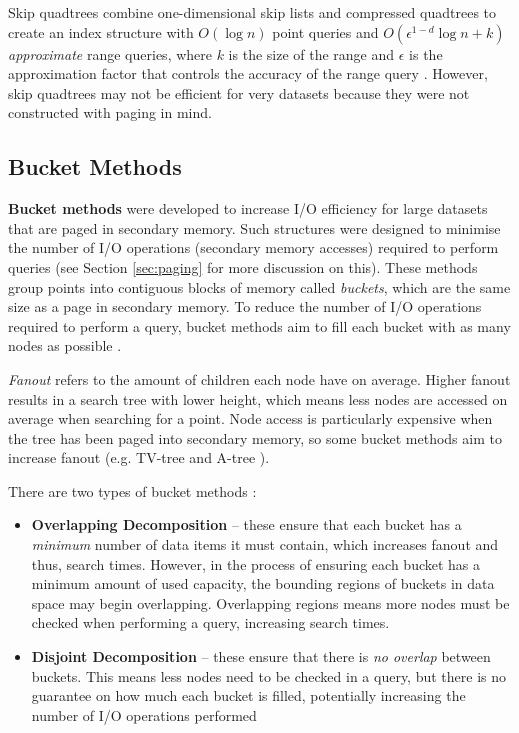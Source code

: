 Skip quadtrees combine one-dimensional skip lists \cite{skip-quadtree} and compressed quadtrees to create an index structure with $O(\log n)$ point queries and $O(\epsilon^{1 - d} \log n + k)$ \textit{approximate} range queries, where $k$ is the size of the range and $\epsilon$ is the approximation factor that controls the accuracy of the range query \cite{skip-quadtree}. However, skip quadtrees may not be efficient for very datasets because they were not constructed with paging in mind.

\subsection{Bucket Methods}
\label{sec:bucket-methods}

\textbf{Bucket methods} were developed to increase I/O efficiency for large datasets that are paged in secondary memory. Such structures were designed to minimise the number of I/O operations (secondary memory accesses) required to perform queries (see Section \ref{sec:paging} for more discussion on this). These methods group points into contiguous blocks of memory called \textit{buckets}, which are the same size as a page in secondary memory. To reduce the number of I/O operations required to perform a query, bucket methods aim to fill each bucket with as many nodes as possible \cite{md-structures-samet}.

\textit{Fanout} refers to the amount of children each node have on average. Higher fanout results in a search tree with lower height, which means less nodes are accessed on average when searching for a point. Node access is particularly expensive when the tree has been paged into secondary memory, so some bucket methods aim to increase fanout (e.g. TV-tree \cite{tv-tree} and A-tree \cite{a-tree}).

There are two types of bucket methods \cite{md-structures-samet}:
\begin{itemize}
	\item \textbf{Overlapping Decomposition} -- these ensure that each bucket has a \textit{minimum} number of data items it must contain, which increases fanout and thus, search times. However, in the process of ensuring each bucket has a minimum amount of used capacity, the bounding regions of buckets in data space may begin overlapping. Overlapping regions means more nodes must be checked when performing a query, increasing search times.
	\item \textbf{Disjoint Decomposition} -- these ensure that there is \textit{no overlap} between buckets. This means less nodes need to be checked in a query, but there is no guarantee on how much each bucket is filled, potentially increasing the number of I/O operations performed
\end{itemize}

